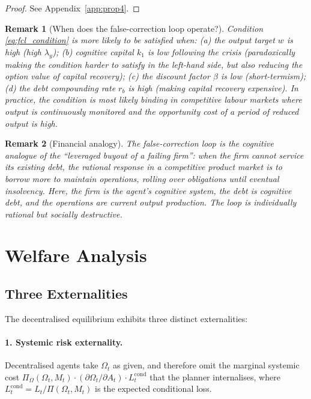 \documentclass[12pt]{article}
\newtheorem{remark}{Remark}
\begin{document}
\begin{proof}
See Appendix~\ref{app:prop4}.
\end{proof}

\begin{remark}[When does the false-correction loop operate?]
Condition \eqref{eq:fcl_condition} is more likely to be satisfied when: (a) the
output target $w$ is high (high $\lambda_y$); (b) cognitive capital $k_1$ is low
following the crisis (paradoxically making the condition harder to satisfy in the
left-hand side, but also reducing the option value of capital recovery); (c) the
discount factor $\beta$ is low (short-termism); (d) the debt compounding rate $r_b$
is high (making capital recovery expensive). In practice, the condition is most
likely binding in competitive labour markets where output is continuously monitored
and the opportunity cost of a period of reduced output is high.
\end{remark}

\begin{remark}[Financial analogy]
The false-correction loop is the cognitive analogue of the ``leveraged buyout of a
failing firm'': when the firm cannot service its existing debt, the rational response
in a competitive product market is to borrow more to maintain operations, rolling
over obligations until eventual insolvency. Here, the firm is the agent's cognitive
system, the debt is cognitive debt, and the operations are current output production.
The loop is individually rational but socially destructive.
\end{remark}

\section{Welfare Analysis}
\label{sec:welfare}

\subsection{Three Externalities}

The decentralised equilibrium exhibits three distinct externalities:

\paragraph{1. Systemic risk externality.} Decentralised agents take $\Omega_t$ as
given, and therefore omit the marginal systemic cost
$\Pi_\Omega(\Omega_t,M_t)\cdot(\partial\Omega_t/\partial A_t)\cdot L_t^{\text{cond}}$
that the planner internalises, where $L_t^{\text{cond}} = L_t/\Pi(\Omega_t,M_t)$ is
the expected conditional loss.
\end{document}
